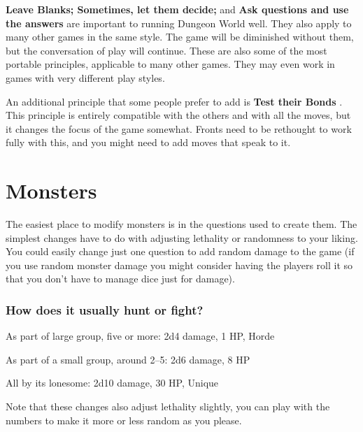        

         {\bf Leave Blanks; Sometimes, let them decide;}  and {\bf Ask questions and use the answers}  are important to running Dungeon World well. They also apply to many other games in the same style. The game will be diminished without them, but the conversation of play will continue. These are also some of the most portable principles, applicable to many other games. They may even work in games with very different play styles.

       

An additional principle that some people prefer to add is {\bf Test their Bonds} . This principle is entirely compatible with the others and with all the moves, but it changes the focus of the game somewhat. Fronts need to be rethought to work fully with this, and you might need to add moves that speak to it.

       
\section{Monsters}   
       

The easiest place to modify monsters is in the questions used to create them. The simplest changes have to do with adjusting lethality or randomness to your liking. You could easily change just one question to add random damage to the game (if you use random monster damage you might consider having the players roll it so that you don't have to manage dice just for damage).

       
\subsubsection{How does it usually hunt or fight?}    
       
\startitemize[1,packed]
         
\item As part of large group, five or more: 2d4 damage, 1 HP, Horde

         
\item As part of a small group, around 2–5: 2d6 damage, 8 HP

         
\item All by its lonesome: 2d10 damage, 30 HP, Unique

       
\stopitemize
       

Note that these changes also adjust lethality slightly, you can play with the numbers to make it more or less random as you please.

